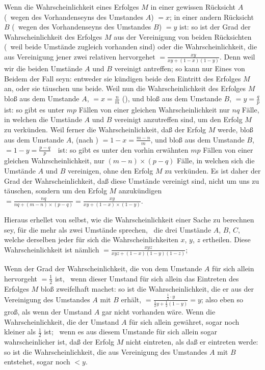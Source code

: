 \begin{aufza}
\begin{aufzb}
\item Wenn die Wahrscheinlichkeit eines Erfolges $M$ in einer gewissen Rücksicht $A$ (\dh\ wegen des Vorhandenseyns des Umstandes $A$) $= x$; in einer andern Rücksicht $B$ (\dh\ wegen des Vorhandenseyns des Umstandes $B$) $= y$ ist: so ist der Grad der Wahrscheinlichkeit des Erfolges $M$ aus der Vereinigung von beiden Rücksichten (\dh\ weil beide Umstände zugleich vorhanden sind) oder die  Wahrscheinlichkeit, die aus Vereinigung jener zwei relativen hervorgehet $= \frac{xy}{xy + (1-x)(1-y)}$. Denn weil wir die beiden Umstände $A$ und $B$ vereinigt antreffen; so kann nur Eines von Beidem der Fall seyn: entweder sie kündigen beide den Eintritt des Erfolges $M$ an, oder sie täuschen uns beide. Weil nun die Wahrscheinlichkeit des Erfolges $M$ bloß aus dem Umstande $A$, $= x = \frac{n}{m}$ (), und bloß aus dem Umstande $B$, $= y = \frac{q}{p}$ ist: so gibt es unter $mp$ Fällen von einer gleichen Wahrscheinlichkeit nur $nq$ Fälle, in welchen die Umstände $A$ und $B$ vereinigt anzutreffen sind, um den Erfolg $M$ zu verkünden. Weil ferner die Wahrscheinlichkeit, daß der Erfolg $M$  werde, bloß aus dem Umstande $A$, (nach ) $= 1 - x = \frac{m-n}{m}$, und bloß aus dem Umstande $B$, $= 1 - y = \frac{p-q}{p}$~\ ist: so gibt es unter den vorhin erwähnten $mp$ Fällen von einer gleichen Wahrscheinlichkeit, nur $(m - n) \times (p - q)$ Fälle, in welchen sich die Umstände $A$ und $B$ vereinigen, ohne den Erfolg $M$ zu verkünden. Es ist daher der Grad der Wahrscheinlichkeit, daß diese Umstände vereinigt sind, nicht um uns zu täuschen, sondern um den Erfolg $M$ anzukündigen $= \frac{nq}{nq+(m-n)\times (p-q)} =  \frac{xy}{xy+(1-x) \times (1-y)}$.
\item Hieraus erhellet von selbst, wie die Wahrscheinlichkeit einer Sache zu berechnen sey, für die mehr als zwei Umstände sprechen, \zB\ die drei Umstände $A$, $B$, $C$, welche derselben jeder für sich die Wahrscheinlichkeiten $x$, $y$, $z$ ertheilen. Diese Wahrscheinlichkeit ist nämlich $= \frac{xyz}{xyz + (1 - x) (1 - y) (1 - z)}$; \usw
\item Wenn der Grad der Wahrscheinlichkeit, die von dem Umstande $A$ für sich allein hervorgeht $= \frac{1}{2}$  ist, \dh\ wenn dieser Umstand für sich allein das Eintreten des Erfolges $M$ bloß zweifelhaft machet: so ist die Wahrscheinlichkeit, die er aus der Vereinigung des Umstandes $A$ mit $B$ erhält, $=  \frac{\frac{1}{2} \cdot y}{\frac{1}{2} y + \frac{1}{2} (1-y)}= y$; also eben so groß, als wenn der Umstand $A$ gar nicht vorhanden wäre. Wenn die Wahrscheinlichkeit, die der Umstand $A$ für sich allein gewähret, sogar noch kleiner als $\frac{1}{2}$ ist; \dh\ wenn es aus diesem Umstande für sich allein sogar wahrscheinlicher ist, daß der Erfolg $M$ nicht eintreten, als daß er eintreten werde: so ist die Wahrscheinlichkeit, die aus Vereinigung des Umstandes $A$ mit $B$ entstehet, sogar noch $< y$.

\end{aufzb}
\end{aufza}
